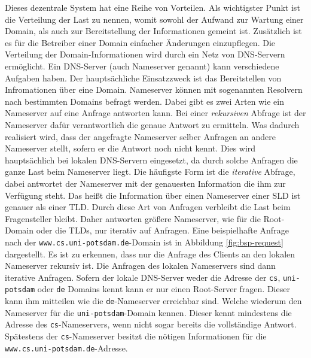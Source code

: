 \documentclass[a4paper, 12pt, BCOR10mm, DIV12, toc=bibliography, toc=listof, german]{scrbook}
\begin{document}
				Dieses dezentrale System hat eine Reihe von Vorteilen. Als wichtigster Punkt ist die
				Verteilung der Last zu nennen, womit sowohl der Aufwand zur Wartung einer Domain, als auch
				zur Bereitstellung der Informationen gemeint ist. Zusätzlich ist es für die Betreiber einer
				Domain einfacher Änderungen einzupflegen. Die Verteilung der Domain-Informationen wird durch
				ein Netz von DNS-Servern ermöglicht. Ein DNS-Server (auch Nameserver genannt) kann
				verschiedene Aufgaben haben. Der hauptsächliche Einsatzzweck ist das Bereitstellen von
				Infromationen über eine Domain. Nameserver können mit sogenannten Resolvern nach bestimmten
				Domains befragt werden. Dabei gibt es zwei Arten wie ein Nameserver auf eine Anfrage
				antworten kann. Bei einer \textit{rekursiven} Abfrage ist der Nameserver dafür
				verantwortlich die genaue Antwort zu ermitteln. Was dadurch realisiert wird, dass der
				angefragte Nameserver selber Anfragen an andere Nameserver stellt, sofern er die Antwort
				noch nicht kennt. Dies wird hauptsächlich bei lokalen DNS-Servern eingesetzt, da durch
				solche Anfragen die ganze Last beim Nameserver liegt. Die häufigste Form ist die
				\textit{iterative} Abfrage, dabei antwortet der Nameserver mit der genauesten Information
				die ihm zur Verfügung steht. Das heißt die Information über einen Nameserver einer SLD ist
				genauer als einer TLD. Durch diese Art von Anfragen verbleibt die Last beim Fragensteller
				bleibt. Daher antworten größere Nameserver, wie für die Root-Domain oder die TLDs, nur
				iterativ auf Anfragen. Eine beispielhafte Anfrage nach der
				\texttt{www.cs.uni-potsdam.de}-Domain ist in Abbildung \ref{fig:bsp-request} dargestellt. Es
				ist zu erkennen, dass nur die Anfrage des Clients an den lokalen Nameserver rekursiv ist. Die
				Anfragen des lokalen Nameservers sind dann iterative Anfragen. Sofern der lokale DNS-Server
				weder die Adresse der \texttt{cs}, \texttt{uni-potsdam} oder \texttt{de} Domains kennt kann
				er nur einen Root-Server fragen.  Dieser kann ihm mitteilen wie die \texttt{de}-Nameserver
				erreichbar sind. Welche wiederum den Nameserver für die \texttt{uni-potsdam}-Domain kennen.
				Dieser kennt mindestens die Adresse des \texttt{cs}-Nameservers, wenn nicht sogar bereits
				die vollständige Antwort.  Spätestens der \texttt{cs}-Nameserver besitzt die nötigen
				Informationen für die \texttt{www.cs.uni-potsdam.de}-Adresse.
\end{document}
